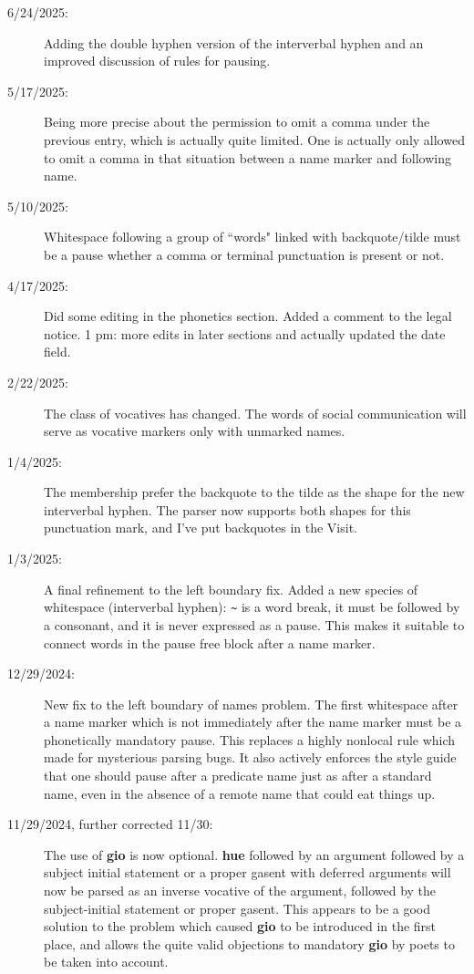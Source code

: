 \documentclass[12pt]{book}
\begin{document}
\begin{description}
\item[6/24/2025:]  Adding the double hyphen version of the interverbal hyphen and an improved discussion of rules for pausing.

\item[5/17/2025:]  Being more precise about the permission to omit a comma under the previous entry, which is actually quite limited.  One is actually only allowed to omit a comma in that situation between a name marker and following name.

\item[5/10/2025:]  Whitespace following a group of ``words" linked with backquote/tilde must be a pause whether a comma or terminal punctuation is present or not.

\item[4/17/2025:]  Did some editing in the phonetics section.  Added a comment to the legal notice.  1 pm:  more edits in later sections and actually updated the date field.

\item[2/22/2025:]  The class of vocatives has changed.  The words of social communication will serve as vocative markers only with unmarked names.

\item[1/4/2025:]  The membership prefer the backquote to the tilde as the shape for the new interverbal hyphen.  The parser now supports both shapes for this punctuation mark, and I've put backquotes in the Visit.

\item[1/3/2025:]  A final refinement to the left boundary fix.  Added a new species of whitespace (interverbal hyphen):  \verb|~| is a word break, it must be followed by a consonant, and it is never expressed as a pause.  This makes it suitable
to connect words in the pause free block after a name marker.

\item[12/29/2024:]  New fix to the left boundary of names problem.  The first whitespace after a name marker which is not immediately after the name marker must be a phonetically mandatory pause.  This replaces a highly nonlocal rule which made for mysterious parsing bugs.  It also actively enforces the style guide that one should pause after a predicate name just as after a standard name, even in the absence of a remote name that could eat things up.

\item[11/29/2024, further corrected 11/30:]  The use of {\bf gio} is now optional.  {\bf hue} followed by an argument followed by a subject initial statement or a proper gasent with deferred arguments will now be parsed as an inverse vocative of the argument, followed by the subject-initial statement or proper gasent.  This appears to be a good solution to the problem which caused {\bf gio} to be introduced in the first place, and allows the quite valid objections to mandatory {\bf gio} by poets to be taken into account.


\end{description}
\end{document}
